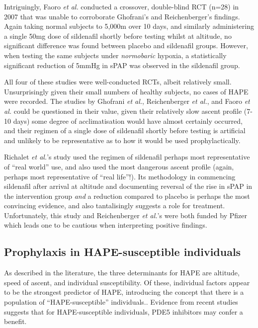 \documentclass[12pt,a4paper]{article}
\begin{document}
Intriguingly, Faoro \emph{et al.} conducted a crossover, double-blind RCT (n=28) in 2007 that was unable to corroborate Ghofrani's and Reichenberger's findings. Again taking normal subjects to 5,000m over 10 days, and similarly administering a single 50mg dose of sildenafil shortly before testing whilst at altitude, no significant difference was found between placebo and sildenafil groups.\cite{Faoro:2007ji} However, when testing the same subjects under \emph{normobaric} hypoxia, a statistically significant reduction of 5mmHg in sPAP was observed in the sildenafil group.\cite{Faoro:2007ji}

All four of these studies were well-conducted RCTs, albeit relatively small. Unsurprisingly given their small numbers of healthy subjects, no cases of HAPE were recorded. The studies by Ghofrani \emph{et al.},\cite{Ghofrani:2004gp} Reichenberger \emph{et al.},\cite{Reichenberger:2007bw} and Faoro \emph{et al.}\cite{Faoro:2007ji} could be questioned in their value, given their relatively slow ascent profile (7-10 days) some degree of acclimatisation would have almost certainly occurred, and their regimen of a single dose of sildenafil shortly before testing is artificial and unlikely to be representative as to how it would be used prophylactically.

Richalet \emph{et al.}'s study\cite{Richalet:2005el} used the regimen of sildenafil perhaps most representative of ``real world'' use, and also used the most dangerous ascent profile (again, perhaps most representative of ``real life''!). Its methodology in commencing sildenafil after arrival at altitude and documenting reversal of the rise in sPAP in the intervention group \emph{and} a reduction compared to placebo is perhaps the most convincing evidence, and also tantalisingly suggests a role for treatment. Unfortunately, this study and Reichenberger \emph{et al.}'s\cite{Reichenberger:2007bw} were both funded by Pfizer which leads one to be cautious when interpreting positive findings.

\subsection*{Prophylaxis in HAPE-susceptible individuals}

As described in the literature, the three determinants for HAPE are altitude, speed of ascent, and individual susceptibility.\cite{Bartsch:2001kc,Bartsch:2002cg,Dehnert:2005ca} Of these, individual factors appear to be the strongest predictor of HAPE,\cite{Bartsch:2002cg} introducing the concept that there is a population of ``HAPE-susceptible'' individuals.\cite{Bartsch:2001kc,Dehnert:2005ca}. Evidence from recent studies suggests that for HAPE-susceptible individuals, PDE5 inhibitors may confer a benefit.
\end{document}
